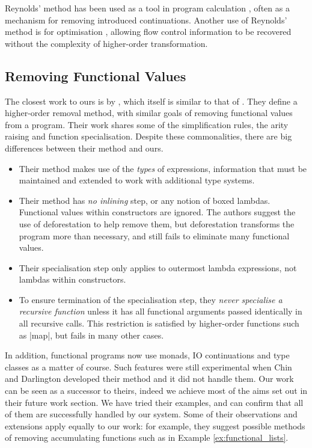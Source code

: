 \documentclass[preprint]{sigplanconf}
\begin{document}
Reynolds' method has been used as a tool in program calculation \cite{danvy:defunctionalization_at_work,hutton:calculating_an_exceptional_machine}, often as a mechanism for removing introduced continuations. Another use of Reynolds' method is for optimisation \cite{jhc}, allowing flow control information to be recovered without the complexity of higher-order transformation.

\subsection{Removing Functional Values}

The closest work to ours is by \citet{chin:higher_order_removal}, which itself is similar to that of \citet{nelan:firstification}. They define a higher-order removal method, with similar goals of removing functional values from a program. Their work shares some of the simplification rules, the arity raising and function specialisation. Despite these commonalities, there are big differences between their method and ours.

\begin{itemize}
\item Their method makes use of the \textit{types} of expressions, information that must be maintained and extended to work with additional type systems.
\item Their method has \textit{no inlining} step, or any notion of boxed lambdas. Functional values within constructors are ignored. The authors suggest the use of deforestation \cite{wadler:deforestation} to help remove them, but deforestation transforms the program more than necessary, and still fails to eliminate many functional values.
\item Their specialisation step only applies to outermost lambda expressions, not lambdas within constructors.
\item To ensure termination of the specialisation step, they \textit{never specialise a recursive function} unless it has all functional arguments passed identically in all recursive calls. This restriction is satisfied by higher-order functions such as |map|, but fails in many other cases.
\end{itemize}

In addition, functional programs now use monads, IO continuations and type classes as a matter of course. Such features were still experimental when Chin and Darlington developed their method and it did not handle them. Our work can be seen as a successor to theirs, indeed we achieve most of the aims set out in their future work section. We have tried their examples, and can confirm that all of them are successfully handled by our system. Some of their observations and extensions apply equally to our work: for example, they suggest possible methods of removing accumulating functions such as in Example \ref{ex:functional_lists}.
\end{document}
